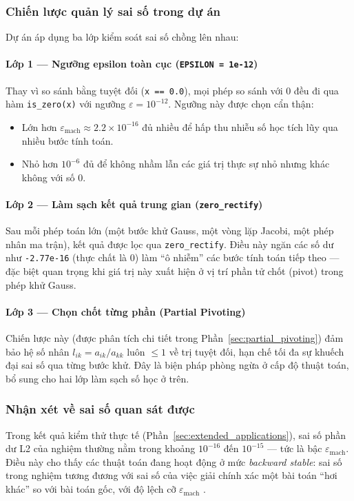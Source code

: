 \subsubsection{Chiến lược quản lý sai số trong dự án}

Dự án áp dụng ba lớp kiểm soát sai số chồng lên nhau:

\paragraph{Lớp 1 --- Ngưỡng epsilon toàn cục (\texttt{EPSILON = 1e-12})}
Thay vì so sánh bằng tuyệt đối (\texttt{x == 0.0}), mọi phép so sánh với 0 đều đi qua hàm \texttt{is\_zero(x)} với ngưỡng $\varepsilon = 10^{-12}$. Ngưỡng này được chọn cẩn thận:
\begin{itemize}
    \item Lớn hơn $\varepsilon_\text{mach} \approx 2.2 \times 10^{-16}$ đủ nhiều để hấp thu nhiễu số học tích lũy qua nhiều bước tính toán.
    \item Nhỏ hơn $10^{-6}$ đủ để không nhầm lẫn các giá trị thực sự nhỏ nhưng khác không với số 0.
\end{itemize}

\paragraph{Lớp 2 --- Làm sạch kết quả trung gian (\texttt{zero\_rectify})}
Sau mỗi phép toán lớn (một bước khử Gauss, một vòng lặp Jacobi, một phép nhân ma trận), kết quả được lọc qua \texttt{zero\_rectify}. Điều này ngăn các số dư như \texttt{-2.77e-16} (thực chất là 0) làm ``ô nhiễm'' các bước tính toán tiếp theo --- đặc biệt quan trọng khi giá trị này xuất hiện ở vị trí phần tử chốt (pivot) trong phép khử Gauss.

\paragraph{Lớp 3 --- Chọn chốt từng phần (Partial Pivoting)}
Chiến lược này (được phân tích chi tiết trong Phần~\ref{sec:partial_pivoting}) đảm bảo hệ số nhân $l_{ik} = a_{ik}/a_{kk}$ luôn $\leq 1$ về trị tuyệt đối, hạn chế tối đa sự khuếch đại sai số qua từng bước khử. Đây là biện pháp phòng ngừa ở cấp độ thuật toán, bổ sung cho hai lớp làm sạch số học ở trên.

\subsubsection{Nhận xét về sai số quan sát được}

Trong kết quả kiểm thử thực tế (Phần~\ref{sec:extended_applications}), sai số phần dư L2 của nghiệm thường nằm trong khoảng $10^{-16}$ đến $10^{-15}$ --- tức là bậc $\varepsilon_\text{mach}$. Điều này cho thấy các thuật toán đang hoạt động ở mức \textit{backward stable}: sai số trong nghiệm tương đương với sai số của việc giải chính xác một bài toán ``hơi khác'' so với bài toán gốc, với độ lệch cỡ $\varepsilon_\text{mach}$ \cite{higham2002, trefethen}.
